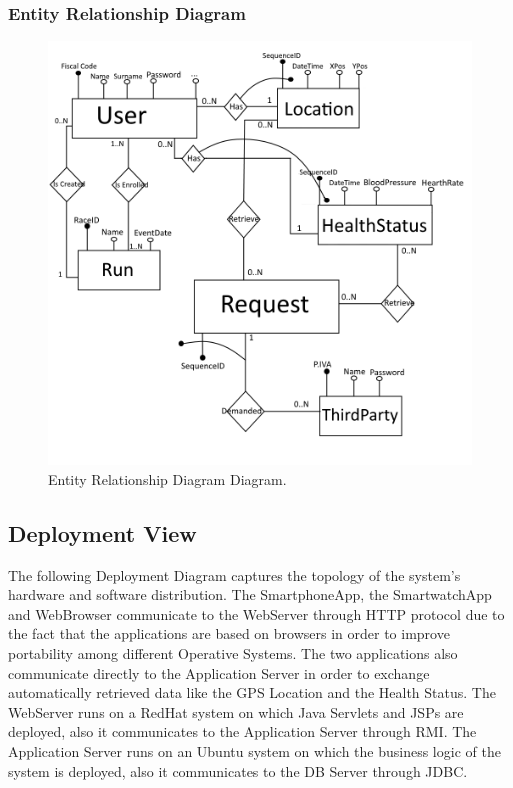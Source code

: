 \clearpage

\subsubsection{Entity Relationship Diagram}
\begin{figure}[H]
\centering
\includegraphics[scale=0.65]{Images/ERDiagram.png}
\caption{Entity Relationship Diagram Diagram.}
\end{figure}

\newpage
\subsection{Deployment View}
The following Deployment Diagram captures the topology of the system's hardware and software distribution.
\bigbreak
\noindent
The SmartphoneApp, the SmartwatchApp and WebBrowser communicate to the WebServer through HTTP protocol due to the fact that the applications are based on browsers in order to improve portability among different Operative Systems. The two applications also communicate directly to the Application Server in order to exchange automatically retrieved data like the GPS Location and the Health Status.
\bigbreak
\noindent
The WebServer runs on a RedHat system on which Java Servlets and JSPs are deployed, also it communicates to the Application Server through RMI.
\bigbreak
\noindent
The Application Server runs on an Ubuntu system on which the business logic  of the system is deployed, also it communicates to the DB Server through JDBC.
\bigbreak

